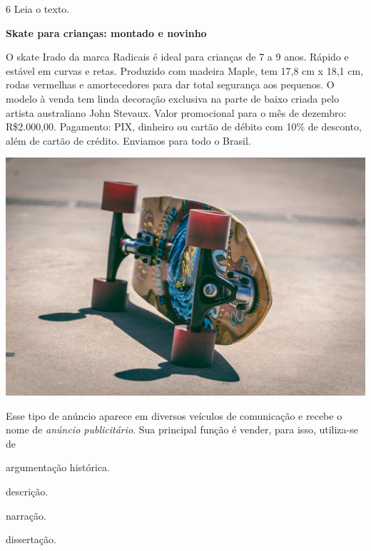 \num{6} Leia o texto.

\begin{myquote}
\textbf{Skate para crianças: montado e novinho}

O skate Irado da marca Radicais é ideal para crianças de 7 a 9 anos.
Rápido e estável em curvas e retas. Produzido com madeira Maple, tem
17,8 cm x 18,1 cm, rodas vermelhas e amortecedores para dar total
segurança aos pequenos. O modelo à venda tem linda decoração exclusiva
na parte de baixo criada pelo artista australiano John Stevaux. Valor
promocional para o mês de dezembro: R\$2.000,00. Pagamento: PIX,
dinheiro ou cartão de débito com 10\% de desconto, além de cartão de
crédito. Enviamos para todo o Brasil.

\begin{center}
\includegraphics[width=\textwidth]{./media/simulados/image5.png}
\end{center}

\end{myquote}

Esse tipo de anúncio aparece em diversos veículos de comunicação 
e recebe o nome de \emph{anúncio publicitário}. Sua principal função
é vender, para isso, utiliza-se de

\begin{multicols}{2}
\begin{escolha}
\item argumentação histórica.

\item descrição.

\item narração.

\item dissertação.
\end{escolha}
\end{multicols}

